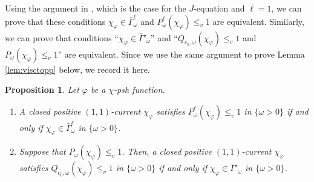 \documentclass{amsart}
\numberwithin{equation}{section}
\theoremstyle{plain}
\newtheorem{prop}[equation]{Proposition}
\theoremstyle{definition}
\theoremstyle{remark}
\begin{document}
Using the argument in \cite[Proposition 2.11]{Mur}, which is the case for the $J$-equation and $\ell=1$, we can prove that these conditions $\chi_\varphi\in\bar{\Gamma}^\ell_\omega$ and $P^\ell_\omega(\chi_\varphi)\le_v 1$ are equivalent. Similarly, we can prove that conditions ``$\chi_\varphi\in\bar{\Gamma}'_\omega$'' and ``$Q_{c_0,\omega}(\chi_\varphi)\le_v1$ and $P_\omega(\chi_\varphi)\le_v 1$'' are equivalent.
Since we use the same argument to prove Lemma \ref{lem:visctopp} below, we record it here.
    \begin{prop}\label{prop:equivalence}
    Let $\varphi$ be a $\chi$-psh function.
        \begin{enumerate}[label={\upshape(\roman*)}]
            \item\label{item:eqgammal} A closed positive  $(1,1)$-current $\chi_\varphi$ satisfies $P^\ell_\omega(\chi_\varphi)\le_v 1$ in $\{\omega>0\}$ if and only if $\chi_\varphi \in \bar{\Gamma}^\ell_\omega$ in $\{\omega>0\}$.
            \item\label{item:eqgamma'} Suppose that $P_\omega(\chi_\varphi)\le_v1$. Then, a closed positive  $(1,1)$-current $\chi_\varphi$ satisfies $Q_{c_0,\omega}(\chi_\varphi)\le_v 1$ in $\{\omega>0\}$ if and only if $\chi_\varphi \in \bar{\Gamma}'_\omega$ in $\{\omega>0\}$.
        \end{enumerate}
    \end{prop}
\end{document}
